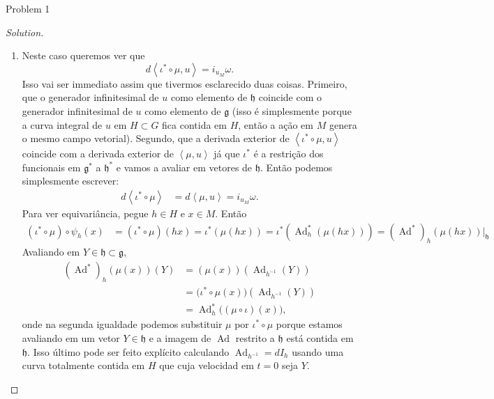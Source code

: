 \begin{thing1}{Problem 1}
\begin{proof}[Solution]
\begin{enumerate}[label=\alph*.]
\item Neste caso queremos ver que
	\[d\left<\iota^*\circ\mu,u\right> =i_{u_M}\omega.\]
Isso vai ser immediato assim que tivermos esclarecido duas coisas. Primeiro, que o generador infinitesimal de $u$ como elemento de $\mathfrak{h}$ coincide com o generador infinitesimal de  $u$ como elemento de $\mathfrak{g}$ (isso é simplesmente porque a curva integral de $u$ em $H\subset G$ fica contida em $H$, então a ação em $M$ genera o mesmo campo vetorial). Segundo, que a derivada exterior de $\left<\iota^*\circ\mu,u\right>$ coincide com a derivada exterior de $\left<\mu,u\right>$ já que $\iota^*$ é a restrição dos funcionais em $\mathfrak{g}^*$ a $\mathfrak{h}^*$ e vamos a avaliar em vetores de $\mathfrak{h}$. Então podemos simplesmente escrever:
\begin{align*}
	d\left<\iota^*\circ\mu\right>&=d\left<\mu,u\right>=i_{u_M}\omega.
\end{align*}
Para ver equivariância, pegue $h \in H$ e $x \in M$. Então 
\begin{align*}
	(\iota^*\circ\mu)\circ \psi_h(x)&=(\iota^*\circ\mu)(hx)=\iota^*(\mu(hx))=\iota^*(\operatorname{Ad}^*_h(\mu(hx)))=(\operatorname{Ad}^*)_h(\mu(hx))\Big|_{\mathfrak{h}}\end{align*}
	Avaliando em $Y\in \mathfrak{h}\subset\mathfrak{g}$,
\begin{align*}	(\operatorname{Ad}^*)_h(\mu(x))(Y)&=(\mu(x))(\operatorname{Ad}_{h^{-1}}(Y))\\&=\Big(\iota^*\circ\mu(x)\Big)(\operatorname{Ad}_{h^{-1}}(Y))\\&=\operatorname{Ad}^*_h\Big((\mu\circ \iota)(x)\Big),
\end{align*}
onde na segunda igualdade podemos substituir $\mu$ por $\iota^*\circ\mu$ porque estamos avaliando em um vetor $Y \in \mathfrak{h}$ e a imagem de $\operatorname{Ad}$ restrito a $\mathfrak{h}$ está contida em $\mathfrak{h}$. Isso último pode ser feito explícito calculando $\operatorname{Ad}_{h^{-1}}=d I_h$ usando uma curva totalmente contida em $H$ que cuja velocidad em $t=0$ seja  $Y$.
\end{enumerate}
\end{proof}
\end{thing1}

